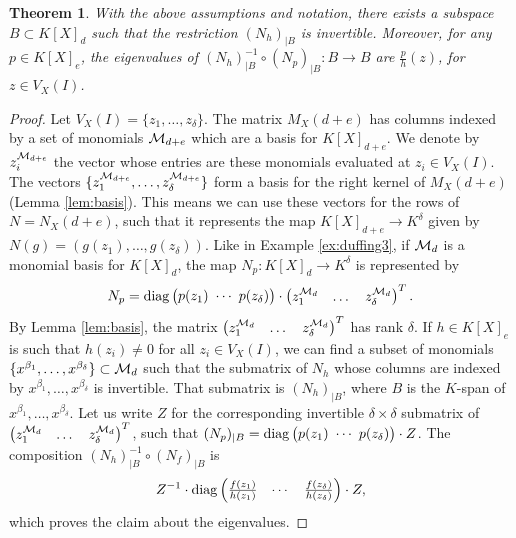 \documentclass[12pt]{article}
\newtheorem{thm}{Theorem}[section]
\theoremstyle{definition}
\theoremstyle{remark}
\def\inv{^{-1}}
\begin{document}
\begin{thm} \label{thm:eigenvaluethm2}
 With the above assumptions and notation, there exists a subspace $B \subset K[X]_d$ such that the restriction $(N_h)_{|B}$ is invertible. Moreover, for any $p \in K[X]_e$, the eigenvalues of $(N_h)_{|B}^{-1} \circ (N_p)_{|B} : B \longrightarrow B$ are $\frac{p}{h}(z)$, for $z \in V_X(I)$. 
\end{thm}

\begin{proof}
    Let $V_X(I) = \{ z_1, \ldots, z_\delta \}$. The matrix $M_X(d+e)$ has columns indexed by a set of monomials ${\cal M}_{d+e}$ which are a basis for $K[X]_{d+e}$. We denote by $z_i^{{\cal M}_{d+e}}$ the vector whose entries are these monomials evaluated at $z_i \in V_X(I)$. The vectors $\{z_1^{{\cal M}_{d+e}}, \ldots, z_\delta^{{\cal M}_{d+e}} \}$ form a basis for the right kernel of $M_X(d+e)$ (Lemma \ref{lem:basis}).
    This means we can use these vectors for the rows of $N=N_X(d+e)$, such that it represents the map $K[X]_{d+e} \rightarrow K^\delta$ given by $N(g) = (g(z_1), \ldots, g(z_\delta))$. 
   Like in Example \ref{ex:duffing3}, if ${\cal M}_{d}$ is a monomial basis for $K[X]_d$, the map $N_p: K[X]_d \rightarrow K^\delta$ is represented by
   \[ N_p={\rm diag}\begin{pmatrix} p(z_1) ~ \cdots ~ p(z_\delta) \end{pmatrix}\cdot\begin{pmatrix} z_1^{{\cal M}_{d}} & \dots & z_\delta^{{\cal M}_{d}}
\end{pmatrix}^T.\]
    By Lemma \ref{lem:basis}, the matrix $\begin{pmatrix} z_1^{{\cal M}_{d}} & \dots & z_\delta^{{\cal M}_{d}}
\end{pmatrix}^T$ has rank $\delta$. If $h \in K[X]_e$ is such that $h(z_i) \neq 0$ for all $z_i \in V_X(I)$, we can find a subset of monomials $\{ x^{\beta_1}, \ldots, x^{\beta_\delta} \} \subset {\cal M}_d$ such that the submatrix of $N_h$ whose columns are indexed by $x^{\beta_1}, \ldots, x^{\beta_\delta}$ is invertible. That submatrix is $(N_h)_{|B}$, where $B$ is the $K$-span of $x^{\beta_1}, \ldots, x^{\beta_\delta}$. Let us write $Z$ for the corresponding invertible $\delta \times \delta$ submatrix of $\begin{pmatrix} z_1^{{\cal M}_{d}} & \dots & z_\delta^{{\cal M}_{d}}
\end{pmatrix}^T$, such that $(N_p)_{|B} = {\rm diag}\begin{pmatrix} p(z_1) ~ \cdots ~ p(z_\delta) \end{pmatrix} \cdot Z$. The composition $(N_h)_{|B}^{-1} \circ (N_f)_{|B}$ is 
    \[ Z\inv \cdot {\rm diag} \begin{pmatrix} \frac{f(z_1)}{h(z_1)}  & \cdots & \frac{f(z_\delta)}{h(z_\delta)} \end{pmatrix}  \cdot Z, \]
    which proves the claim about the eigenvalues.
\end{proof}
\end{document}
